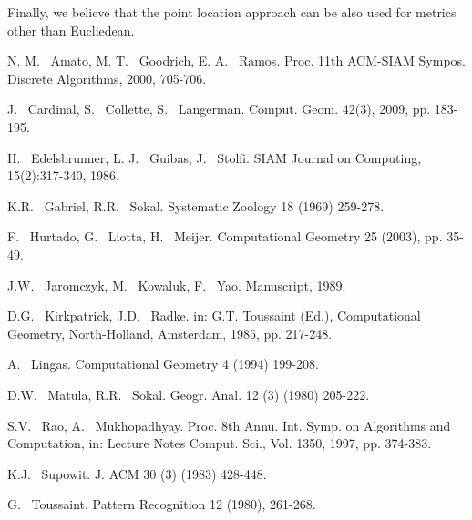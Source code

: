 \documentclass[10pt]{article}
\begin{document}
Finally, we believe that the point location approach can be also used for
metrics other than Eucliedean. 





\small 


\begin{thebibliography}{99}


N. M. ~Amato, M. T. ~Goodrich, E. A. ~Ramos. 
\newblock Proc. 11th ACM-SIAM Sympos. Discrete Algorithms, 2000, 705-706. 

J. ~Cardinal, S. ~Collette, S. ~Langerman. 
\newblock Comput. Geom. 42(3), 2009, pp. 183-195. 

H. ~Edelsbrunner, L. J. ~Guibas, J. ~Stolfi. 
\newblock SIAM Journal on Computing, 15(2):317-340, 1986. 

K.R. ~Gabriel, R.R. ~Sokal. 
\newblock Systematic Zoology 18 (1969) 259-278. 

F. ~Hurtado, G. ~Liotta, H. ~Meijer. 
\newblock Computational Geometry 25 (2003), pp. 35-49. 

J.W. ~Jaromczyk, M. ~Kowaluk, F. ~Yao. 
\newblock Manuscript, 1989. 

D.G. ~Kirkpatrick, J.D. ~Radke. 
\newblock in: G.T. Toussaint (Ed.), Computational Geometry, North-Holland, Amsterdam, 1985, pp. 217-248. 

A. ~Lingas. 
\newblock Computational Geometry 4 (1994) 199-208. 

D.W. ~Matula, R.R. ~Sokal. 
\newblock Geogr. Anal. 12 (3) (1980) 205-222. 

S.V. ~Rao, A. ~Mukhopadhyay. 
\newblock Proc. 8th Annu. Int. Symp. on Algorithms and Computation, in: Lecture Notes Comput. Sci., 
Vol. 1350, 1997, pp. 374-383. 

K.J. ~Supowit. 
\newblock J. ACM 30 (3) (1983) 428-448. 

G. ~Toussaint. 
\newblock Pattern Recognition 12 (1980), 261-268. 

\end{thebibliography}
\end{document}
